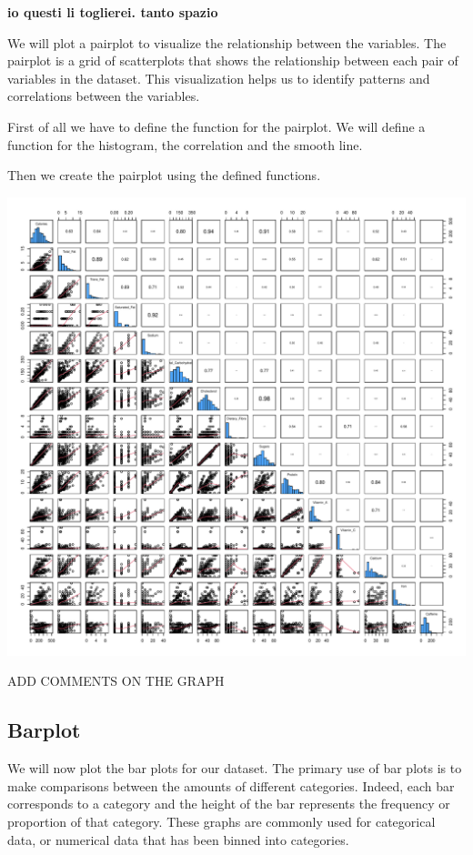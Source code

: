 \documentclass[
]{article}
\begin{document}
\textbf{io questi li toglierei. tanto spazio}

We will plot a pairplot to visualize the relationship between the
variables. The pairplot is a grid of scatterplots that shows the
relationship between each pair of variables in the dataset. This
visualization helps us to identify patterns and correlations between the
variables.

First of all we have to define the function for the pairplot. We will
define a function for the histogram, the correlation and the smooth
line.

Then we create the pairplot using the defined functions.

\begin{center}\includegraphics{Statistical_Learning_Final_Report_files/figure-latex/pairplot-1} \end{center}

ADD COMMENTS ON THE GRAPH

\hypertarget{barplot}{%
\subsection{Barplot}\label{barplot}}

We will now plot the bar plots for our dataset. The primary use of bar
plots is to make comparisons between the amounts of different
categories. Indeed, each bar corresponds to a category and the height of
the bar represents the frequency or proportion of that category. These
graphs are commonly used for categorical data, or numerical data that
has been binned into categories.
\end{document}
